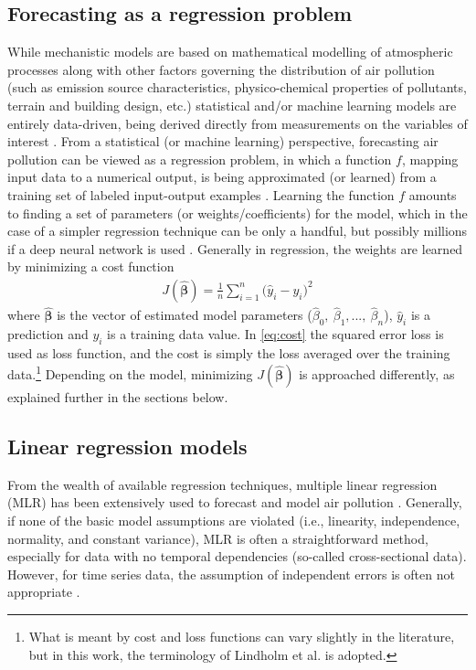 \subsection{Forecasting as a regression problem}
\label{sec:forecasting}
While mechanistic models are based on mathematical modelling of atmospheric processes along with other factors governing the distribution of air pollution (such as emission source characteristics, physico-chemical properties of pollutants, terrain and building design, etc.) statistical and/or machine learning models are entirely data-driven, being derived directly from measurements on the variables of interest \cite{ElHarbawi2013}. From a statistical (or machine learning) perspective, forecasting air pollution can be viewed as a regression problem, in which a function $f$, mapping input data to a numerical output, is being approximated (or learned) from a training set of labeled input-output examples \cite{smlbook}. Learning the function $f$ amounts to finding a set of parameters (or weights/coefficients) for the model, which in the case of a simpler regression technique can be only a handful, but possibly millions if a deep neural network is used \cite{smlbook}. Generally in regression, the weights are learned by minimizing a cost function
\begin{align}
J(\bm{\hat{\beta}}) = \frac{1}{n} \sum_{i=1}^{n} \big(\hat{y}_i - y_i \big)^2
\label{eq:cost}
\end{align}
where $\bm{\hat{\beta}}$ is the vector of estimated model parameters ($\hat{\beta}_0, \: \hat{\beta}_1, ..., \: \hat{\beta}_n$), $\hat{y}_i$ is a prediction and $y_i$ is a training data value\cite{smlbook}. In \cref{eq:cost} the squared error loss is used as loss function, and the cost is simply the loss averaged over the training data.\footnote{What is meant by cost and loss functions can vary slightly in the literature, but in this work, the terminology of Lindholm et al. \cite{smlbook} is adopted.} Depending on the model, minimizing $J(\bm{\hat{\beta}})$ is approached differently, as explained further in the sections below. 

\subsection{Linear regression models}

From the wealth of available regression techniques, multiple linear regression (MLR) has been extensively used to forecast and model air pollution \cite{atmos7020015}. Generally, if none of the basic model assumptions are violated (i.e., linearity, independence, normality, and constant variance), MLR is often a straightforward method, especially for data with no temporal dependencies (so-called cross-sectional data). However, for time series data, the assumption of independent errors is often not appropriate \cite{Montgomery2015}. 

